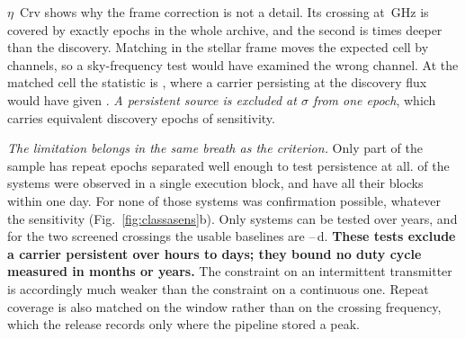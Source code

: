 $\eta$~Crv shows why the frame correction is not a detail. Its crossing at
\VnEcrFreq\,GHz is covered by exactly \VnEcrNCover{} epochs in the whole
archive, and the second is \VnEcrDepthRatio{} times deeper than the
discovery. Matching in the stellar frame moves the expected cell by
\VnEcrDchan{} channels, so a sky-frequency test would have examined the
wrong channel. At the matched cell the statistic is \VnEcrOtherT, where a
carrier persisting at the discovery flux would have given \VnEcrTPers.
\emph{A persistent source is excluded at \VnEcrExcl$\sigma$ from one epoch},
which carries \VnEcrNeff{} equivalent discovery epochs of sensitivity.

\emph{The limitation belongs in the same breath as the criterion.} Only part
of the sample has repeat epochs separated well enough to test persistence at
all. \EpOne{} of the \EpTot{} systems were observed in a single execution
block, and \EpSameDay{} have all their blocks within one day. For none of
those systems was confirmation possible, whatever the sensitivity
(Fig.~\ref{fig:classasens}b). Only \EpYears{} systems can be tested over
years, and for the two screened crossings the usable baselines are
\UnattSepMinD--\UnattSepMaxD\,d. \textbf{These tests exclude a carrier
persistent over hours to days; they bound no duty cycle measured in months
or years.} The constraint on an intermittent transmitter is accordingly much
weaker than the constraint on a continuous one. Repeat coverage is also
matched on the window rather than on the crossing frequency, which the
release records only where the pipeline stored a peak.

\begin{table}
\centering
\caption{\textbf{The crossing ledger.} Every one of the \NCross{} threshold
crossings: the star, its execution block, the ALMA band, the crossing
frequency, the search statistic $T_\star$, the molecular transition the
stellar-frame $\pm\MaskHalfKms$\,km\,s$^{-1}$ mask attributes it to, the
velocity offset $\Delta v$ from that transition, and its disposition.
Frequencies marked $^{*}$ are window centres, the crossing frequency not
having been recorded. Block identifiers omit the constant \texttt{A002\_}
prefix. Dispositions are \textbf{A} attributed to a molecular transition,
\textbf{U1} unattributed and outranked by at least one control position, and
\textbf{U2} unattributed, outranking every control, tested for recurrence
and absent in the repeat epochs.}
\label{tab:ledger}
\tiny

\end{table}


